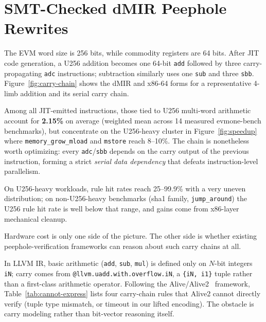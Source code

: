 \section{SMT-Checked dMIR Peephole Rewrites}
\label{sec:method}

The EVM word size is 256 bits, while commodity registers are 64 bits.
After JIT code generation, a U256 addition becomes one 64-bit
\texttt{add} followed by three carry-propagating \texttt{adc}
instructions; subtraction similarly uses one \texttt{sub} and three
\texttt{sbb}. Figure~\ref{fig:carry-chain} shows the dMIR and x86-64
forms for a representative 4-limb addition and its serial carry chain.



Among all JIT-emitted instructions, those tied to U256 multi-word
arithmetic account for \textbf{2.15\%} on average (weighted mean across
14 measured evmone-bench benchmarks), but concentrate on the U256-heavy
cluster in Figure~\ref{fig:speedup} where \texttt{memory\_grow\_mload}
and \texttt{mstore} reach 8--10\%. The chain is nonetheless worth
optimizing: every \texttt{adc}/\texttt{sbb} depends on the carry output
of the previous instruction, forming a strict \emph{serial data
dependency} that defeats instruction-level parallelism.

On U256-heavy workloads, rule hit rates reach 25--99.9\% with a very
uneven distribution; on non-U256-heavy benchmarks (sha1 family,
\texttt{jump\_around}) the U256 rule hit rate is well below that range,
and gains come from x86-layer mechanical cleanup.

Hardware cost is only one side of the picture. The other side is
whether existing peephole-verification frameworks can reason about such
carry chains at all.

{\sloppy
In LLVM IR, basic arithmetic (\texttt{add}, \texttt{sub}, \texttt{mul})
is defined only on $N$-bit integers \texttt{iN}; carry comes from
\texttt{@llvm.uadd.with.overflow.iN}, a \texttt{\{iN, i1\}} tuple rather
than a first-class arithmetic operator. Following the
Alive/Alive2~\cite{alive,alive2} framework, Table~\ref{tab:cannot-express}
lists four carry-chain rules that Alive2 cannot directly verify (tuple
type mismatch, or timeout in our lifted encoding). The obstacle is carry
modeling rather than bit-vector reasoning itself.\par}

\FloatBarrier



